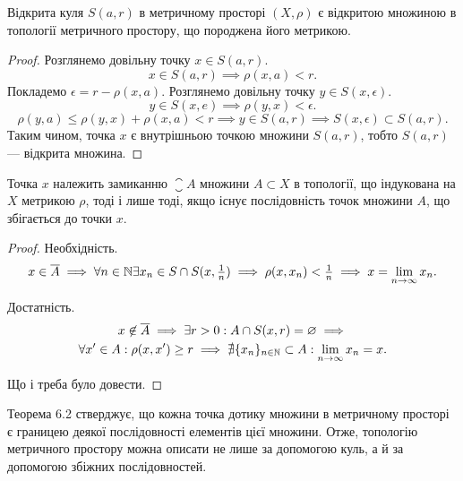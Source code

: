 \begin{theorem}
Відкрита куля $S(a, r)$ в метричному
просторі $(X, \rho)$ є відкритою множиною в топології
метричного простору, що породжена його метрикою.
\end{theorem}

\begin{proof}
Розглянемо довільну точку $x \in S(a, r)$.
\begin{equation*}
    x \in S(a, r) \implies
    \rho(x, a) < r.
\end{equation*}
Покладемо $\epsilon = r - \rho(x, a)$. Розглянемо довільну точку
$y \in S(x, \epsilon)$.
\begin{equation*}
    y \in S(x, e) \implies
    \rho(y, x) < \epsilon.
\end{equation*}
\begin{equation*}
    \rho(y, a) \le
    \rho(y, x) + \rho(x, a) < r \implies
    y \in S(a, r) \implies S(x, \epsilon) \subset S(a, r).
\end{equation*}
Таким чином, точка $x$ є внутрішньою точкою множини
$S(a, r)$, тобто $S(a, r)$ --- відкрита множина. 
\end{proof}

\begin{theorem}
Точка $x$ належить замиканню $\closure A$ множини
$A \subset X$ в топології, що індукована на $X$ метрикою $\rho$, тоді і
лише тоді, якщо існує послідовність точок множини $A$, що
збігається до точки $x$.
\end{theorem}

\begin{proof}
Необхідність.
\begin{equation*}
    x \in \overline{A} \implies
    \forall n \in \mathbb{N} \exists x_n \in S \cap S(x, \tfrac{1}{n}) \implies
    \rho(x, x_n) < \tfrac{1}{n} \implies
    x = \lim_{n \to \infty} x_n.
\end{equation*}

Достатність.
\begin{multline*}
    x \not\in \overline{A} \implies
    \exists r > 0: A \cap S(x, r) = \varnothing \implies \\
    \forall x' \in A: \rho(x, x') \ge r \implies
    \nexists \{x_n\}_{n \in \mathbb{N}} \subset A: \lim_{n \to \infty} x_n = x.
\end{multline*}

Що і треба було довести.
\end{proof}

\begin{corollary}
Теорема 6.2 стверджує, що кожна точка
дотику множини в метричному просторі є границею деякої
послідовності елементів цієї множини. Отже, топологію
метричного простору можна описати не лише за
допомогою куль, а й за допомогою збіжних послідовностей.
\end{corollary}

